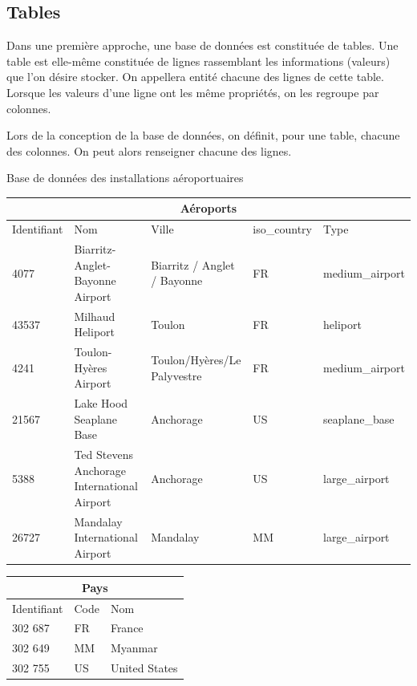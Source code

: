\documentclass[10pt]{article}
\begin{document}
\subsection{Tables}
Dans une première approche, une base de données est constituée de tables. Une table est elle-même constituée de lignes rassemblant les informations (valeurs) que l'on désire stocker. On appellera entité chacune des lignes de cette table. Lorsque les valeurs d'une ligne ont les même propriétés, on les regroupe par colonnes. 

Lors de la conception de la base de données, on définit, pour une table, chacune des colonnes. On peut alors renseigner chacune des lignes. 

\begin{exemple}
Base de données des installations aéroportuaires
\begin{center}
\begin{tabular}{lp{4cm}p{3cm}ll}
\hline
\multicolumn{5}{c}{Aéroports} \\
\hline
Identifiant & Nom & Ville & iso\_country & Type \\
\hline
\hline
4077 &Biarritz-Anglet-Bayonne Airport & Biarritz / Anglet / Bayonne & FR &  medium\_airport \\
43537 &Milhaud Heliport & Toulon & FR  & heliport \\
4241 &Toulon-Hyères Airport & Toulon/Hyères/Le Palyvestre & FR &  medium\_airport \\
21567 &Lake Hood Seaplane Base & Anchorage & US &   seaplane\_base\\
5388 &Ted Stevens Anchorage International Airport & Anchorage & US & large\_airport\\
26727 &Mandalay International Airport & Mandalay & MM  & large\_airport\\
\hline
\end{tabular}
\end{center}

\begin{center}
\begin{tabular}{lll}
\hline
\multicolumn{3}{c}{Pays} \\
\hline
Identifiant & Code & Nom \\
\hline
\hline
302 687 & FR & France \\
302 649 & MM & Myanmar \\
302 755 & US & United States \\
\hline
\end{tabular}
\end{center}
\end{exemple}
\end{document}
